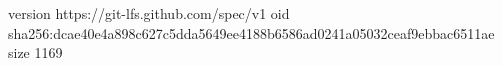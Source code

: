 version https://git-lfs.github.com/spec/v1
oid sha256:dcae40e4a898c627c5dda5649ee4188b6586ad0241a05032ceaf9ebbac6511ae
size 1169
